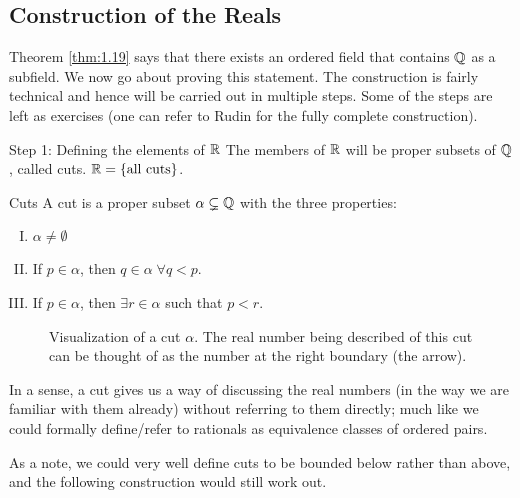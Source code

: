 \subsection{Construction of the Reals}
Theorem \ref{thm:1.19} says that there exists an ordered field that contains $\mathbb{Q}$ as a subfield. We now go about proving this statement. The construction is fairly technical and hence will be carried out in multiple steps. Some of the steps are left as exercises (one can refer to Rudin for the fully complete construction).

\begin{nblank}{Step 1: Defining the elements of $\mathbb{R}$}
    The members of $\mathbb{R}$ will be proper subsets of $\mathbb{Q}$, called cuts. $\mathbb{R} = \set{\text{all cuts}}$. 
    \begin{ndef}{Cuts}
        A cut is a proper subset $\alpha \subsetneq \mathbb{Q}$ with the three properties:
        \begin{enumerate}[(I)]
            \item $\alpha \neq \emptyset$
            \item If $p \in \alpha$, then $q \in \alpha \; \forall q < p$. 
            \item If $p \in \alpha$, then $\exists r \in \alpha$ such that $p < r$. 
        \end{enumerate}
    \end{ndef}
\end{nblank}
\begin{figure}[htbp]
    \centering
    \caption{Visualization of a cut $\alpha$. The real number being described of this cut can be thought of as the number at the right boundary (the arrow).}
    \label{fig2} 
\end{figure}
\noindent In a sense, a cut gives us a way of discussing the real numbers (in the way we are familiar with them already) without referring to them directly; much like we could formally define/refer to rationals as equivalence classes of ordered pairs.  

\noindent As a note, we could very well define cuts to be bounded below rather than above, and the following construction would still work out.

